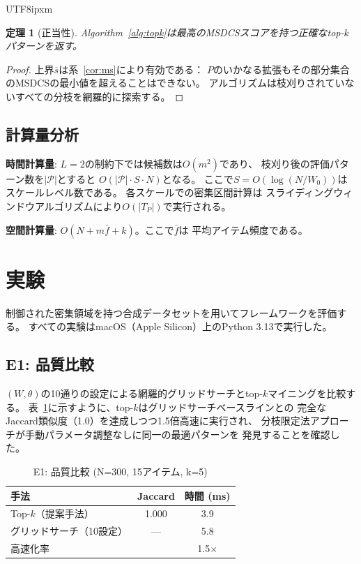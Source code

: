 \documentclass[conference]{IEEEtran}
\newtheorem{theorem}{定理}
\begin{document}
\begin{CJK}{UTF8}{ipxm}
\begin{theorem}[正当性]
Algorithm~\ref{alg:topk}は最高のMSDCSスコアを持つ正確なtop-$k$パターンを返す。
\end{theorem}

\begin{proof}
上界$\overline{s}$は系~\ref{cor:ms}により有効である：
$P$のいかなる拡張もその部分集合のMSDCSの最小値を超えることはできない。
アルゴリズムは枝刈りされていないすべての分枝を網羅的に探索する。
\end{proof}

\subsection{計算量分析}

\textbf{時間計算量}: $L{=}2$の制約下では候補数は$O(m^2)$であり、
枝刈り後の評価パターン数を$|\mathcal{P}|$とすると
$O(|\mathcal{P}| \cdot S \cdot N)$となる。
ここで$S = O(\log(N/W_0))$はスケールレベル数である。
各スケールでの密集区間計算は
スライディングウィンドウアルゴリズムにより$O(|T_P|)$で実行される。

\textbf{空間計算量}: $O(N + m\bar{f} + k)$。ここで$\bar{f}$は
平均アイテム頻度である。

\section{実験}\label{sec:experiments}

制御された密集領域を持つ合成データセットを用いてフレームワークを評価する。
すべての実験はmacOS（Apple Silicon）上のPython 3.13で実行した。

\subsection{E1: 品質比較}

$(W, \theta)$の10通りの設定による網羅的グリッドサーチとtop-$k$マイニングを比較する。
表~\ref{tab:e1}に示すように、top-$k$はグリッドサーチベースラインとの
完全なJaccard類似度（1.0）を達成しつつ1.5倍高速に実行され、
分枝限定法アプローチが手動パラメータ調整なしに同一の最適パターンを
発見することを確認した。

\begin{table}[t]
\centering
\caption{E1: 品質比較 (N=300, 15アイテム, k=5)}\label{tab:e1}
\begin{tabular}{lcc}
\toprule
手法 & Jaccard & 時間 (ms) \\
\midrule
Top-$k$（提案手法） & 1.000 & 3.9 \\
グリッドサーチ（10設定） & --- & 5.8 \\
\midrule
高速化率 & & 1.5$\times$ \\
\bottomrule
\end{tabular}
\end{table}


\end{CJK}
\end{document}
